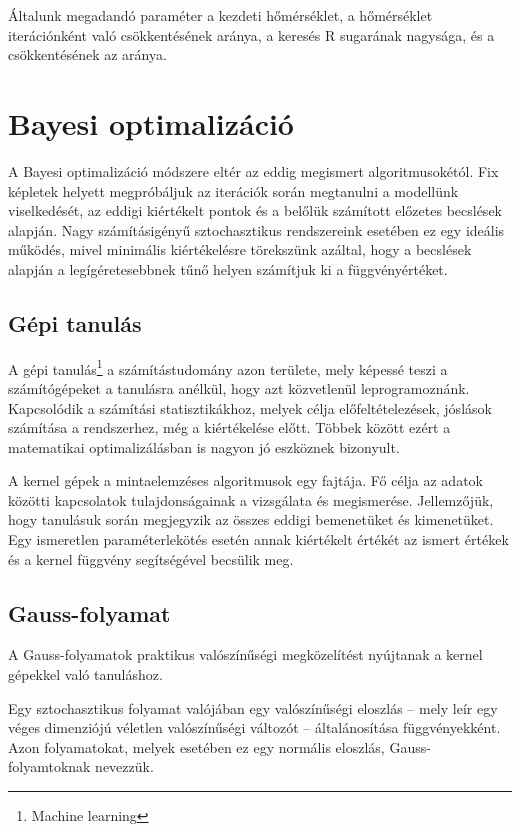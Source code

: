 Általunk megadandó paraméter a kezdeti hőmérséklet, a hőmérséklet iterációnként való csökkentésének aránya, a keresés R sugarának nagysága, és a csökkentésének az aránya.

\section{Bayesi optimalizáció}
A Bayesi optimalizáció módszere eltér az eddig megismert algoritmusokétól. Fix képletek helyett megpróbáljuk az iterációk során megtanulni a modellünk viselkedését, az eddigi kiértékelt pontok és a belőlük számított előzetes becslések alapján. Nagy számításigényű sztochasztikus rendszereink esetében ez egy ideális működés, mivel minimális kiértékelésre törekszünk azáltal, hogy a becslések alapján a legígéretesebbnek tűnő helyen számítjuk ki a függvényértéket.
\subsection{Gépi tanulás}
A gépi tanulás\footnote{Machine learning} a számítástudomány azon területe, mely képessé teszi a számítógépeket a tanulásra anélkül, hogy azt közvetlenül leprogramoznánk. Kapcsolódik a számítási statisztikákhoz, melyek célja előfeltételezések, jóslások számítása a rendszerhez, még a kiértékelése előtt. Többek között ezért a matematikai optimalizálásban is nagyon jó eszköznek bizonyult.

A kernel gépek a mintaelemzéses algoritmusok egy fajtája. Fő célja az adatok közötti kapcsolatok tulajdonságainak a vizsgálata és megismerése. Jellemzőjük, hogy tanulásuk során megjegyzik az összes eddigi bemenetüket és kimenetüket. Egy ismeretlen paraméterlekötés esetén annak kiértékelt értékét az ismert értékek és a kernel függvény segítségével becsülik meg.

\subsection{Gauss-folyamat}
A Gauss-folyamatok praktikus valószínűségi megközelítést nyújtanak a kernel gépekkel való tanuláshoz. 

Egy sztochasztikus folyamat valójában egy valószínűségi eloszlás -- mely leír egy véges dimenziójú véletlen valószínűségi változót -- általánosítása függvényekként. Azon folyamatokat, melyek esetében ez egy normális eloszlás, Gauss-folyamtoknak nevezzük.

